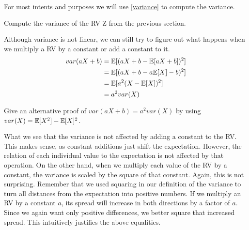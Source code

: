 For most intents and purposes we will use \eqref{variance} to compute the variance. 


\begin{Exercise}
Compute the variance of the RV Z from the previous section.
\end{Exercise}

Although variance is not linear, we can still try to figure out what happens when we multiply a RV by a constant or add a constant to it.
\begin{align}
var(aX+b) &= \mathbb{E}[ (aX+b - \mathbb{E}[aX+b])^2 ] \\
&=\mathbb{E}[ (aX+b - a\mathbb{E}[X] - b)^2 ] \\
&=\mathbb{E}[ a^2 (X-\mathbb{E}[X])^2 ] \\
&= a^2 var(X)
\end{align}

\begin{Exercise}
Give an alternative proof of $var(aX+b) = a^2 var(X)$ by using $var(X)
= \mathbb{E}[X^{2}] - \mathbb{E}[X]^{2}$.
\end{Exercise}

What we see that the variance is not affected by adding a constant to the RV. This makes sense, as constant additions just shift
the expectation. However, the relation of each individual value to the expectation is not affected by that operation. On the other hand,
when we multiply each value of the RV by a constant, the variance is scaled by the square of that constant. Again, this is not surprising.
Remember that we used squaring in our definition of the variance to turn all distances from the expectation into positive numbers.
If we multiply an RV by a constant $ a $, its spread will increase in both directions by a factor of $ a $. 
Since we again want only positive differences,
we better square that increased spread. This intuitively justifies the above equalities.

